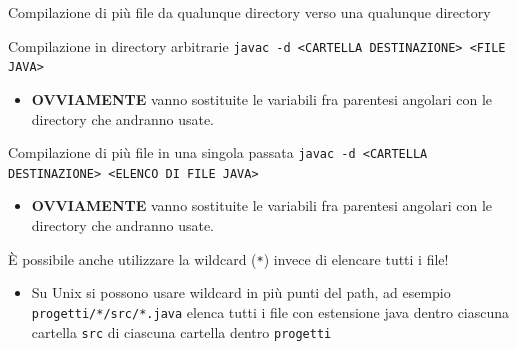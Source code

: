 \documentclass[xcolor=dvipsnames,presentation]{beamer}
\begin{document}
\begin{frame}{Compilazione di più file da qualunque directory verso una qualunque directory}
  \begin{block}{Compilazione in directory arbitrarie}
    \texttt{javac {\color{red}-d <CARTELLA DESTINAZIONE>} <FILE JAVA>}
    \begin{itemize}
      \item \textbf{OVVIAMENTE} vanno sostituite le variabili fra parentesi angolari con le
directory che andranno usate.
    \end{itemize}
  \end{block}
  \begin{block}{Compilazione di più file in una singola passata}
    \texttt{javac -d <CARTELLA DESTINAZIONE> {\color{red}<ELENCO DI FILE JAVA>}}
    \begin{itemize}
      \item \textbf{OVVIAMENTE} vanno sostituite le variabili fra parentesi angolari con le
directory che andranno usate.
    \end{itemize}
  \end{block}
  È possibile anche utilizzare la wildcard (\texttt{*}) invece di elencare tutti i file!
  \begin{itemize}
    \item Su Unix si possono usare wildcard in più punti del path, ad esempio
\texttt{progetti/*/src/*.java} elenca tutti i file con estensione java dentro ciascuna cartella
\texttt{src} di ciascuna cartella dentro \texttt{progetti}
  \end{itemize}
\end{frame}
\end{document}
